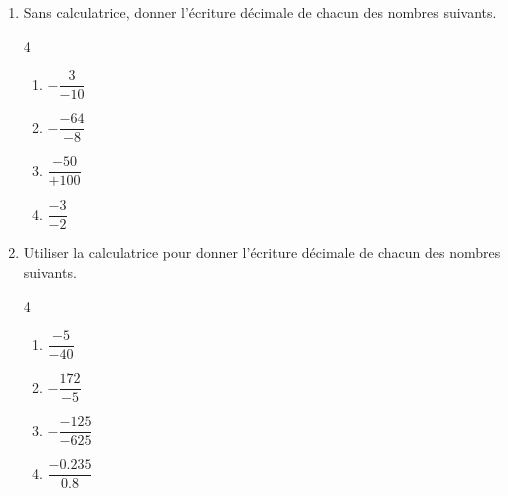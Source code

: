 \begin{exercice*}
  \begin{enumerate}
    \item Sans calculatrice, donner l'écriture décimale de chacun des nombres suivants.
        \begin{multicols}4
          \begin{enumerate}
            \item $-\dfrac{3}{-10}$
            \item $-\dfrac{-64}{-8}$
            \item $\dfrac{-50}{+100}$
            \item $\dfrac{-3}{-2}$
          \end{enumerate}
        \end{multicols}        
        \item Utiliser la calculatrice pour donner l'écriture décimale de chacun des nombres suivants.
        \begin{multicols}4
          \begin{enumerate}
            \item $\dfrac{-5}{-40}$
            \item $-\dfrac{172}{-5}$
            \item $-\dfrac{-125}{-625}$
            \item $\dfrac{-\num{0.235}}{\num{0.8}}$
          \end{enumerate}
        \end{multicols}
  \end{enumerate} 
\end{exercice*}
